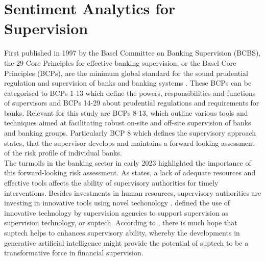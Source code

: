 \chapter{Sentiment Analytics for Supervision}\label{sec2}
\thispagestyle{empty}

First published in 1997 by the Basel Committee on Banking Supervision (BCBS), the 29 Core Principles for effective banking supervision, or the Basel Core Principles (BCPs), are the minimum global standard for the sound prudential regulation and supervision of banks and banking systems \citep{bis2024}. These BCPs can be categorised to BCPs 1-13 which define the powers, responsibilities and functions of supervisors and BCPs 14-29 about prudential regulations and requirements for banks. Relevant for this study are BCPs 8-13, which outline various tools and techniques aimed at facilitating robust on-site and off-site supervision of banks and banking groups. Particularly BCP 8 which defines the supervisory approach states, that the supervisor develops and maintains a forward-looking assessment of the risk profile of individual banks. \\


The turmoils in the banking sector in early 2023 highlighted the importance of this forward-looking risk assessment. As \cite{prenio2024} states, a lack of adequate resources and effective tools affects the ability of supervisory authorities for timely interventions. Besides investments in human resources, supervisory authorities are investing in innovative tools using novel techonology \citep{prenio2024}. \cite{broeders2018} defined the use of innovative technology by supervision agencies to support supervision as supervision technology, or suptech. According to \cite{prenio2024}, there is much hope that suptech helps to enhances supervisory ability, whereby the developments in generative artificial intelligence might provide the potential of suptech to be a transformative force in financial supervision. \\

